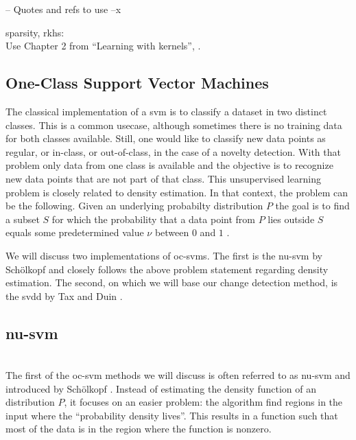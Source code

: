 -- Quotes and refs to use --x

sparsity, \gls{rkhs}: \cite{girosi1998equivalence} \\

Use Chapter 2 from ``Learning with kernels'', \cite{scholkopf2002learning}.


\subsection{One-Class Support Vector Machines}\label{subsec:one-class-svm}
The classical implementation of a \gls{svm} is to classify a dataset in two distinct classes.
This is a common usecase, although sometimes there is no training data for both classes available.
Still, one would like to classify new data points as regular, or in-class, or out-of-class, \eg in the case of a novelty detection.
With that problem only data from one class is available and the objective is to recognize new data points that are not part of that class.
This unsupervised learning problem is closely related to density estimation.
In that context, the problem can be the following.
Given an underlying probabilty distribution $P$ the goal is to find a subset $S$ for which the probability that a data point from $P$ lies outside $S$ equals some predetermined value $\nu$ between $0$ and $1$ \cite{scholkopf1999support}.

We will discuss two implementations of \glspl{oc-svm}.
The first is the \gls{nu-svm} by Sch\"olkopf \etal \cite{scholkopf1999support} and closely follows the above problem statement regarding density estimation.
The second, on which we will base our change detection method, is the \gls{svdd} by Tax and Duin \cite{tax1999support}.



\subsection{\acrlong{nu-svm}}\label{subsec:nu-svm}
 \\
The first of the \gls{oc-svm} methods we will discuss is often referred to as \gls{nu-svm} and introduced by Sch\"olkopf \etal \cite{scholkopf1999support}.
Instead of estimating the density function of an distribution $P$, it focuses on an easier problem: the algorithm find regions in the input where the ``probability density lives''.
This results in a function such that most of the data is in the region where the function is nonzero.

